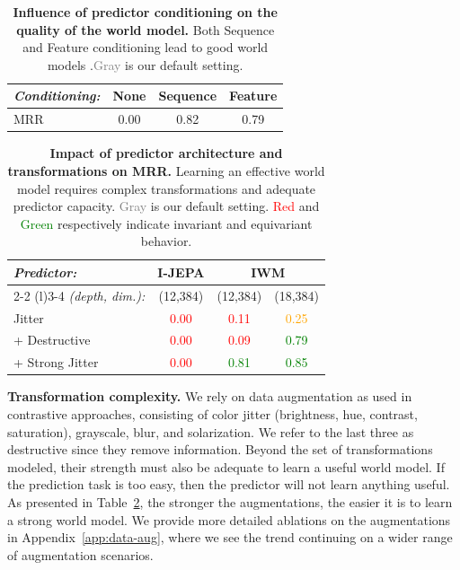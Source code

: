 \documentclass[twocolumn]{fairmeta}
\theoremstyle{plain}
\theoremstyle{definition}
\theoremstyle{remark}
\begin{document}
\begin{table}[!t]
    \centering
    \caption{\fontsize{8.5pt}{8.5pt}\selectfont
    \textbf{Influence of predictor conditioning on the quality of the world model.} Both Sequence and Feature conditioning lead to good world models .\textcolor{gray}{Gray} is our default setting.}
    \begin{tabular}{lccc}
    \toprule
      \it Conditioning: & None & Sequence & Feature \\
     \midrule
     MRR & 0.00 & 0.82 & \cellcolor{Gray} 0.79 \\
     \bottomrule
    \end{tabular}
    \label{tab:conditioning}
    \vspace{-1em}
\end{table}

\begin{table}[!t]
    \centering
    \caption{\fontsize{8.5pt}{8.5pt}\selectfont
    \textbf{Impact of predictor architecture and transformations on MRR.} Learning an effective world model requires complex transformations and adequate predictor capacity. \textcolor{gray}{Gray} is our default setting. \textcolor{Red}{Red} and \textcolor{Green}{Green} respectively indicate invariant and equivariant behavior.}

    \begin{tabular}{lccc}
    \toprule
     \it Predictor: & I-JEPA     & \multicolumn{2}{c}{IWM} \\
     \cmidrule(l){2-2}  \cmidrule(l){3-4}
     \it (depth, dim.): & (12,384) & (12,384) & (18,384)  \\
     \midrule
    Jitter & \textcolor{Red}{0.00} &\textcolor{Red}{0.11} & \textcolor{orange}{0.25} \\
    + Destructive  & \textcolor{Red}{0.00}   & \textcolor{Red}{0.09} & \cellcolor{Gray} \textcolor{Green}{0.79}  \\
    + Strong Jitter & \textcolor{Red}{0.00} & \textcolor{Green}{0.81} & \textcolor{Green}{0.85} \\
     \bottomrule
    \end{tabular}
    \label{tab:achieving-equivariance}
\end{table}


\textbf{Transformation complexity.} We rely on data augmentation as used in contrastive approaches, consisting of color jitter (brightness, hue, contrast, saturation), grayscale, blur, and solarization. We refer to the last three as destructive since they remove information.
Beyond the set of transformations modeled, their strength must also be adequate to learn a useful world model. If the prediction task is too easy, then the predictor will not learn anything useful. As presented in Table~\ref{tab:achieving-equivariance}, the stronger the augmentations, the easier it is to learn a strong world model. We provide more detailed ablations on the augmentations in Appendix~\ref{app:data-aug}, where we see the trend continuing on a wider range of augmentation scenarios.
\end{document}
